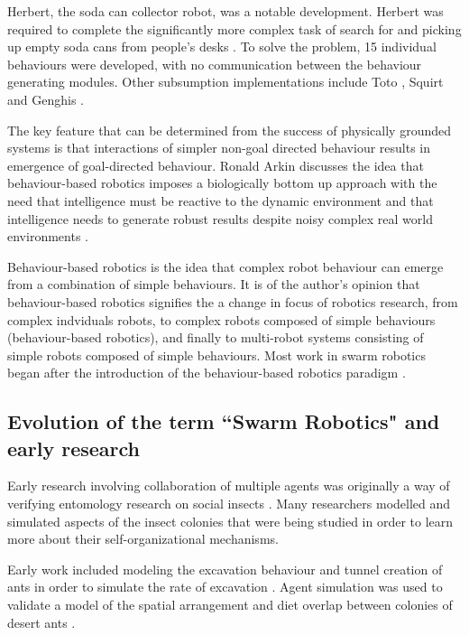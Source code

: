 Herbert, the soda can collector robot, was a notable development. Herbert was required to complete the significantly more complex task of search for and picking up empty soda cans from people's desks \cite{connell1989colony}. To solve the problem, 15 individual behaviours were developed, with no communication between the behaviour generating modules. Other subsumption implementations include Toto \cite{mataric1990distributed}, Squirt \cite{flynn1989world} and Genghis \cite{brooks1989robot}.

The key feature that can be determined from the success of physically grounded systems is that interactions of simpler non-goal directed behaviour results in emergence of goal-directed behaviour. Ronald Arkin discusses the idea that behaviour-based robotics imposes a biologically bottom up approach with the need that intelligence must be reactive to the dynamic environment and that intelligence needs to generate robust results despite noisy complex real world environments \cite{arkin1990integrating}.

Behaviour-based robotics is the idea that complex robot behaviour can emerge from a combination of simple behaviours. It is of the author's opinion that behaviour-based robotics signifies the a change in focus of robotics research, from complex indviduals robots, to complex robots composed of simple behaviours (behaviour-based robotics), and finally to multi-robot systems consisting of simple robots composed of simple behaviours. Most work in swarm robotics began after the introduction of the behaviour-based robotics paradigm \cite{arai2002editorial}.

\subsection{Evolution of the term ``Swarm Robotics" and early research}
\label{early-research}

Early research involving collaboration of multiple agents was originally a way of verifying entomology research on social insects \cite{dorigo2014swarm, beni1993swarm, seeley2009wisdom}. Many researchers modelled and simulated aspects of the insect colonies that were being studied in order to learn more about their self-organizational mechanisms. 

Early work included modeling the excavation behaviour and tunnel creation of ants in order to simulate the rate of excavation \cite{sudd1975model}. Agent simulation was used to validate a model of the spatial arrangement and diet overlap between colonies of desert ants \cite{ryti1984spatial}.

